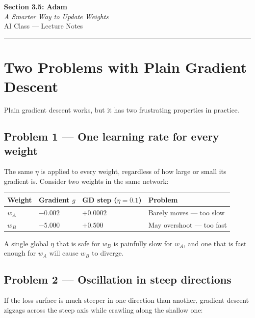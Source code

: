 \documentclass[12pt, a4paper]{article}
\newif\ifstudentmode
\theoremstyle{definition}
\begin{document}
\begin{center}
  {\LARGE \textbf{Section 3.5: Adam}} \\[0.3em]
  {\large\itshape A Smarter Way to Update Weights} \\[0.5em]
  {\large AI Class --- Lecture Notes}%
  \ifstudentmode
    \quad {\normalsize\color{gray}[Student Copy]}%
  \fi
\end{center}

\vspace{1em}
\hrule
\vspace{1.5em}

\section{Two Problems with Plain Gradient Descent}

Plain gradient descent works, but it has two frustrating properties in
practice.

\subsection*{Problem 1 — One learning rate for every weight}

The same $\eta$ is applied to every weight, regardless of how large or small
its gradient is.  Consider two weights in the same network:

\begin{center}
\renewcommand{\arraystretch}{1.3}
\begin{tabular}{llll}
\toprule
Weight & Gradient $g$ & GD step ($\eta=0.1$) & Problem \\
\midrule
$w_A$ & $-0.002$ & $+0.0002$ & Barely moves --- too slow \\
$w_B$ & $-5.000$ & $+0.500$  & May overshoot --- too fast \\
\bottomrule
\end{tabular}
\end{center}

A single global $\eta$ that is safe for $w_B$ is painfully slow for $w_A$,
and one that is fast enough for $w_A$ will cause $w_B$ to diverge.

\subsection*{Problem 2 — Oscillation in steep directions}

If the loss surface is much steeper in one direction than another, gradient
descent zigzags across the steep axis while crawling along the shallow one:
\end{document}
